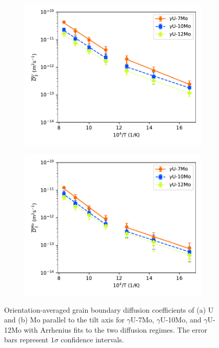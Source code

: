 \documentclass{elsarticle}
\begin{document}
\begin{figure}[!ht]
\begin{subfigure}{0.49\textwidth}
	\centering
	\caption{}
	\includegraphics[width=\textwidth]{2reg_U_Dz.pdf}
\end{subfigure}
\begin{subfigure}{0.49\textwidth}
	\centering
	\caption{}
	\includegraphics[width=\textwidth]{2reg_Mo_Dz.pdf}
\end{subfigure}
\caption{Orientation-averaged grain boundary diffusion coefficients of (a) U and (b) Mo parallel to the tilt axis for $\gamma$U-7Mo, $\gamma$U-10Mo, and $\gamma$U-12Mo with Arrhenius fits to the two diffusion regimes. The error bars represent $1\sigma$ confidence intervals.}
\label{fig:2reg}
\end{figure}
\end{document}
